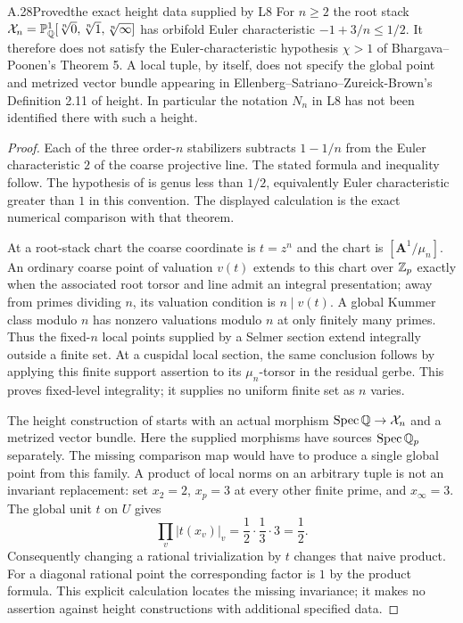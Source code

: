 \begin{statement}{A.28}{Proved}{the exact height data supplied by L8}
For $n\ge2$ the root stack
$\mathcal X_n=\mathbb P^1_\mathbb Q[\sqrt[n]{0},\sqrt[n]{1},\sqrt[n]{\infty}]$
has orbifold Euler characteristic $-1+3/n\le1/2$.
It therefore does not satisfy the Euler-characteristic hypothesis
$\chi>1$ of Bhargava--Poonen's Theorem 5. A local tuple, by itself,
does not specify the global point and metrized vector bundle appearing
in Ellenberg--Satriano--Zureick-Brown's Definition 2.11 of height.
In particular the notation $N_n$ in L8 has not been identified there
with such a height.
\end{statement}
\begin{proof}
Each of the three order-$n$ stabilizers subtracts $1-1/n$ from the
Euler characteristic $2$ of the coarse projective line. The stated
formula and inequality follow. The hypothesis of
\cite[Theorem 5]{BhargavaPoonen2020} is genus less than $1/2$,
equivalently Euler characteristic greater than $1$ in this convention.
The displayed calculation is the exact numerical comparison with
that theorem.

At a root-stack chart the coarse coordinate is $t=z^n$ and the chart
is $[\mathbf A^1/\mu_n]$. An ordinary coarse point of valuation
$v(t)$ extends to this chart over $\mathbb Z_p$ exactly when the associated
root torsor and line admit an integral presentation; away from primes
dividing $n$, its valuation condition is $n\mid v(t)$. A global
Kummer class modulo $n$ has nonzero valuations modulo $n$ at only
finitely many primes. Thus the fixed-$n$ local points supplied by a
Selmer section extend integrally outside a finite set. At a cuspidal
local section, the same conclusion follows by applying this finite
support assertion to its $\mu_n$-torsor in the residual gerbe.
This proves fixed-level integrality; it supplies no uniform finite set
as $n$ varies.

The height construction of
\cite[Definition 2.11]{ESZB2023} starts with an actual morphism
$\operatorname{Spec}\mathbb Q\to\mathcal X_n$ and a metrized vector bundle.
Here the supplied morphisms have sources $\operatorname{Spec}\mathbb Q_p$
separately. The missing comparison map would have to produce a
single global point from this family. A product of local norms on an
arbitrary tuple is not an invariant replacement: set $x_2=2$,
$x_p=3$ at every other finite prime, and $x_\infty=3$.
The global unit $t$ on $U$ gives
\[
 \prod_v |t(x_v)|_v=\frac12\cdot\frac13\cdot3=\frac12.
\]
Consequently changing a rational trivialization by $t$ changes that
naive product. For a diagonal rational point the corresponding
factor is $1$ by the product formula. This explicit calculation
locates the missing invariance; it makes no assertion against height
constructions with additional specified data.
\end{proof}

